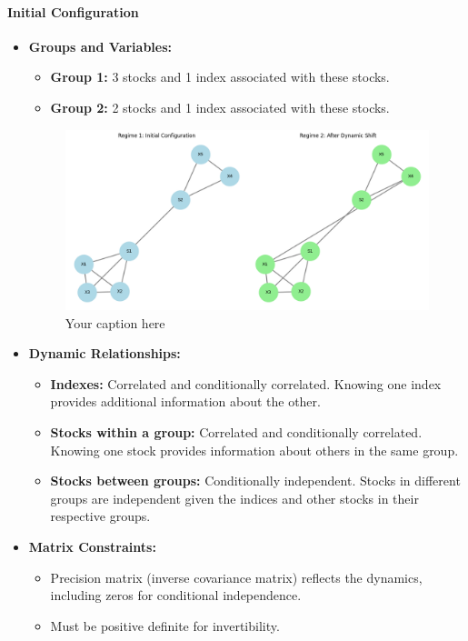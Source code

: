 \documentclass{article}
\begin{document}
\paragraph{Initial Configuration}
\begin{itemize}
    \item \textbf{Groups and Variables:}
    \begin{itemize}
        \item \textbf{Group 1:} 3 stocks and 1 index associated with these stocks.
        \item \textbf{Group 2:} 2 stocks and 1 index associated with these stocks.
    \end{itemize}

    \begin{figure}[h!]
    \centering
    \includegraphics[width=\textwidth]{synthetic_data.png}
    \caption{Your caption here}
    \label{fig:label}
\end{figure}


    \item \textbf{Dynamic Relationships:}
    \begin{itemize}
        \item \textbf{Indexes:} Correlated and conditionally correlated. Knowing one index provides additional information about the other.
        \item \textbf{Stocks within a group:} Correlated and conditionally correlated. Knowing one stock provides information about others in the same group.
        \item \textbf{Stocks between groups:} Conditionally independent. Stocks in different groups are independent given the indices and other stocks in their respective groups.
    \end{itemize}
    \item \textbf{Matrix Constraints:}
    \begin{itemize}
        \item Precision matrix (inverse covariance matrix) reflects the dynamics, including zeros for conditional independence.
        \item Must be positive definite for invertibility.
    \end{itemize}
\end{itemize}
\end{document}
